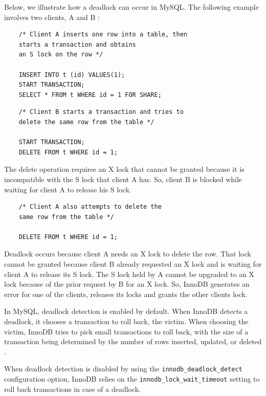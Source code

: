 \documentclass[12pt]{article}
\newcounter{subsubsubsection}[subsubsection]
\begin{document}
Below, we illustrate how a deadlock can occur in MySQL. The following example involves two clients, A and B \parencite{deadlockExample}:

\begin{verbatim}
    /* Client A inserts one row into a table, then
    starts a transaction and obtains
    an S lock on the row */

    INSERT INTO t (id) VALUES(1);
    START TRANSACTION;
    SELECT * FROM t WHERE id = 1 FOR SHARE;
\end{verbatim}

 
\begin{verbatim}
    /* Client B starts a transaction and tries to 
    delete the same row from the table */
    
    START TRANSACTION;
    DELETE FROM t WHERE id = 1;    
\end{verbatim}

The delete operation requires an X lock that cannot be granted because it is incompatible with the S lock that client A has. So, client B is blocked while waiting for client A to release his S lock.

\begin{verbatim}
    /* Client A also attempts to delete the
    same row from the table */
    
    DELETE FROM t WHERE id = 1;
\end{verbatim}

Deadlock occurs because client A needs an X lock to delete the row. That lock cannot be granted because client B already requested an X lock and is waiting for client A to release its S lock. The S lock held by A cannot be upgraded to an X lock because of the prior request by B for an X lock. So, InnoDB generates an error for one of the clients, releases its locks and grants the other clients lock.

\label{deadlockDetection}
In MySQL, deadlock detection is enabled by default. When InnoDB detects a deadlock, it chooses a transaction to roll back, the victim. When choosing the victim, InnoDB tries to pick small transactions to roll back, with the size of a transaction being determined by the number of rows inserted, updated, or deleted \parencite{deadlockdetectionAndRollback}.

When deadlock detection is disabled by using the \verb|innodb_deadlock_detect| configuration option, InnoDB relies on the \verb|innodb_lock_wait_timeout| setting to roll back transactions in case of a deadlock.
\end{document}

